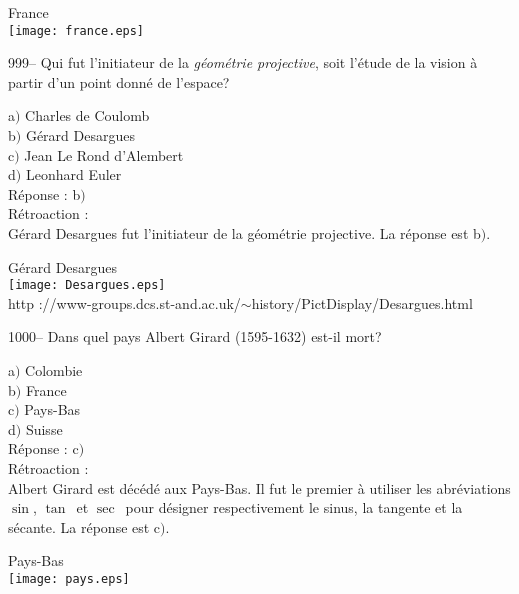 ﻿\documentclass[letterpaper, 12pt]{article}
\begin{document}
        \begin{center}
        France\\
    \texttt{[image: france.eps]}\\
    \end{center}

999-- Qui fut l'initiateur de la {\sl g\'eom\'etrie projective},
soit l'\'etude de la vision \`a partir d'un point donn\'e de
l'espace?

a$)$ Charles de Coulomb \\
b$)$ G\'erard Desargues\\
c$)$ Jean Le Rond d'Alembert \\
d$)$ Leonhard Euler\\

R\'eponse : b$)$\\

R\'etroaction : \\
G\'erard Desargues fut l'initiateur de la g\'eom\'etrie projective.
La r\'eponse est b$)$.\\



    \begin{center}
        G\'erard Desargues\\
    \texttt{[image: Desargues.eps]}\\
        {\footnotesize http
://www-groups.dcs.st-and.ac.uk/$\sim$history/PictDisplay/Desargues.html}
    \end{center}

1000-- Dans quel pays Albert Girard (1595-1632) est-il mort?

a$)$ Colombie \\
b$)$ France \\
c$)$ Pays-Bas \\
d$)$ Suisse\\

R\'eponse : c$)$\\

R\'etroaction : \\
Albert Girard est d\'ec\'ed\'e aux Pays-Bas. Il fut le premier \`a
utiliser les abr\'eviations \og $\sin$\fg, \og $\tan$\fg\ et \og
$\sec$\fg\ pour d\'esigner respectivement le sinus, la tangente et
la s\'ecante.
La r\'eponse est c$)$.\\

        \begin{center}
        Pays-Bas\\
    \texttt{[image: pays.eps]}\\
    \end{center}
\end{document}
